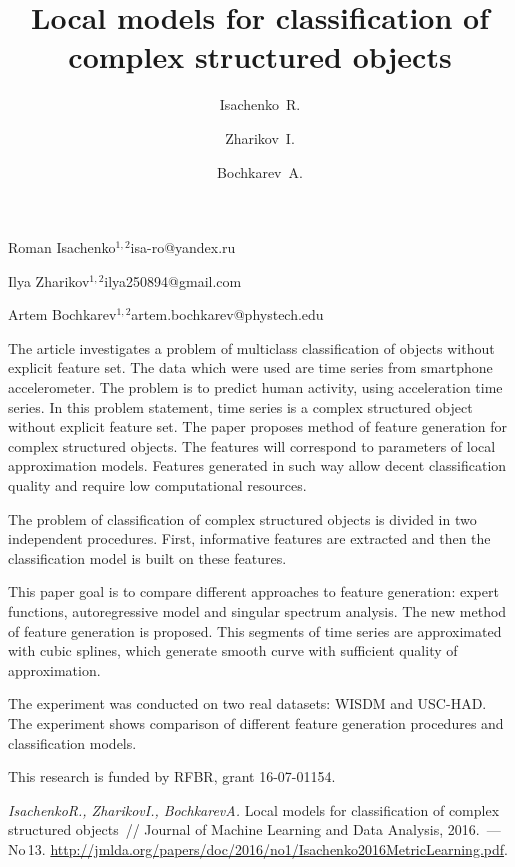 \documentclass[twoside]{article}
\begin{document}
\English
\title{Local models for classification of complex structured objects}
\author{Isachenko~R.}{Roman Isachenko$^{1, 2}$}{isa-ro@yandex.ru}
\author{Zharikov~I.}{Ilya Zharikov$^{1, 2}$}{ilya250894@gmail.com}
\author{Bochkarev~A.}{Artem Bochkarev$^{1, 2}$\speaker}{artem.bochkarev@phystech.edu}
\maketitle

The article investigates a problem of multiclass classification of objects without explicit feature set.
The data which were used are time series from smartphone accelerometer.
The problem is to predict human activity, using acceleration time series.
In this problem statement, time series is a complex structured object without explicit feature set.
The paper proposes method of feature generation for complex structured objects.
The features will correspond to parameters of local approximation models.
Features generated in such way allow decent classification quality and require low computational resources.

The problem of classification of complex structured objects is divided in two independent procedures.
First, informative features are extracted and then the classification model is built on these features.

This paper goal is to compare different approaches to feature generation: expert functions, autoregressive model and singular spectrum analysis.
The new method of feature generation is proposed.
This segments of time series are approximated with cubic splines, which generate smooth curve with sufficient quality of approximation.

The experiment was conducted on two real datasets: WISDM and USC-HAD.\\
The experiment shows comparison of different feature generation procedures and classification models.

This research is funded by RFBR, grant 16-07-01154.

\begin{thebibliography}{1}
    \emph{Isachenko\;R., Zharikov\;I., Bochkarev\;A.}
    Local models for classification of complex structured objects~//
    Journal of Machine Learning and Data Analysis, 2016.~--- No\,13. %
    \url{http://jmlda.org/papers/doc/2016/no1/Isachenko2016MetricLearning.pdf}.
\end{thebibliography}
\end{document}
